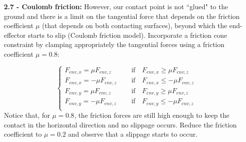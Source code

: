 \documentclass[11pt]{article}
\begin{document}
\quad

\noindent
\textbf{ 2.7 - Coulomb friction:} 
However, our contact point is not ``glued" to the ground and there is a limit on the tangential force that depends on the friction coefficient $\mu$ (that depends on both contacting surfaces), 
beyond which the end-effector starts to slip (Coulomb friction model). Incorporate a friction cone constraint by clamping  appropriately the tangential forces using  a friction coefficient $\mu = 0.8$:

\begin{equation*}
\begin{cases}
F_{env, x} = \mu F_{env, z}  \quad &\text{   if}\quad F_{env, x} \geq \mu F_{env, z} \\ 
F_{env, x} = -\mu F_{env, z}  \quad &\text{   if}\quad F_{env, x} \leq -\mu F_{env, z} \\ 
F_{env, y} = \mu F_{env, z}  \quad &\text{   if}\quad F_{env, y} \geq \mu F_{env, z} \\ 
F_{env, y} = -\mu F_{env, z}  \quad &\text{   if}\quad F_{env, y} \leq -\mu F_{env, z} \\ 
\end{cases}
\end{equation*}
%
Notice that, for $\mu = 0.8$, the friction forces are still high enough to keep the contact in the horizontal direction and no slippage occurs.  Reduce the friction coefficient to $\mu = 0.2$ and observe that a slippage starts to occur.
% 
\end{document}

